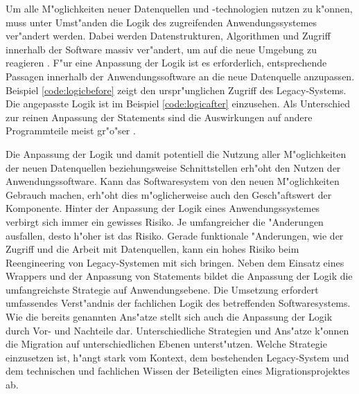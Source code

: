 Um alle M"oglichkeiten neuer Datenquellen und -technologien nutzen zu k"onnen, muss unter Umst"anden die Logik des zugreifenden Anwendungssystemes ver"andert werden. Dabei werden Datenstrukturen, Algorithmen und Zugriff innerhalb der Software massiv ver"andert, um auf die neue Umgebung zu reagieren \citep{henrard-2002}.
\lb
F"ur eine Anpassung der Logik ist es erforderlich, entsprechende Passagen innerhalb der Anwendungssoftware an die neue Datenquelle anzupassen. Beispiel \ref{code:logicbefore} zeigt den urspr"unglichen Zugriff des Legacy-Systems. Die angepasste Logik ist im Beispiel \ref{code:logicafter} einzusehen. Als Unterschied zur reinen Anpassung der Statements sind die Auswirkungen auf andere Programmteile meist gr"o"ser \citep{henrard-2002}.





Die Anpassung der Logik und damit potentiell die Nutzung aller M"oglichkeiten der neuen Datenquellen beziehungsweise Schnittstellen erh"oht den Nutzen der Anwendungssoftware. Kann das Softwaresystem von den neuen M"oglichkeiten Gebrauch machen, erh"oht dies m"oglicherweise auch den Gesch"aftswert der Komponente. 
\lb
Hinter der Anpassung der Logik eines Anwendungssystemes verbirgt sich immer ein gewisses Risiko. Je umfangreicher die "Anderungen ausfallen, desto h"oher ist das Risiko. Gerade funktionale "Anderungen, wie der Zugriff und die Arbeit mit Datenquellen, kann ein hohes Risiko beim Reengineering von Legacy-Systemen mit sich bringen.
\lb
Neben dem Einsatz eines Wrappers und der Anpassung von Statements bildet die Anpassung der Logik die umfangreichste Strategie auf Anwendungsebene. Die Umsetzung erfordert umfassendes Verst"andnis der fachlichen Logik des betreffenden Softwaresystems. Wie die bereits genannten Ans"atze stellt sich auch die Anpassung der Logik durch Vor- und Nachteile dar. Unterschiedliche Strategien und Ans"atze k"onnen die Migration auf unterschiedlichen Ebenen unterst"utzen. Welche Strategie einzusetzen ist, h"angt stark vom Kontext, dem bestehenden Legacy-System und dem technischen und fachlichen Wissen der Beteiligten eines Migrationsprojektes ab.